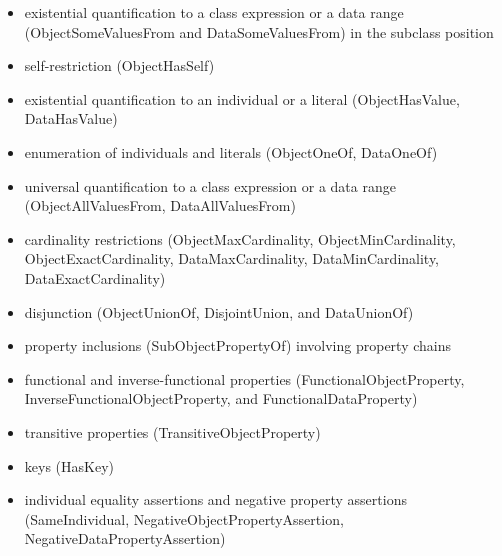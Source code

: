 \documentclass{llncs}
\begin{document}
\begin{itemize}
	\item existential quantification to a class expression or a data range (ObjectSomeValuesFrom and DataSomeValuesFrom) in the subclass position
  \item self-restriction (ObjectHasSelf)
  \item existential quantification to an individual or a literal (ObjectHasValue, DataHasValue)
  \item enumeration of individuals and literals (ObjectOneOf, DataOneOf)
  \item universal quantification to a class expression or a data range (ObjectAllValuesFrom, DataAllValuesFrom)
  \item cardinality restrictions (ObjectMaxCardinality, ObjectMinCardinality, ObjectExactCardinality, DataMaxCardinality, DataMinCardinality, DataExactCardinality)
  \item disjunction (ObjectUnionOf, DisjointUnion, and DataUnionOf)
  \item property inclusions (SubObjectPropertyOf) involving property chains
  \item functional and inverse-functional properties (FunctionalObjectProperty, InverseFunctionalObjectProperty, and FunctionalDataProperty)
  \item transitive properties (TransitiveObjectProperty)
  \item keys (HasKey)
  \item individual equality assertions and negative property assertions (SameIndividual, NegativeObjectPropertyAssertion, NegativeDataPropertyAssertion)
\end{itemize}



{}

\setcounter{tocdepth}{1}
\end{document}
